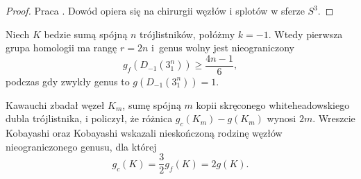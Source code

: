 \begin{proof}
    Praca \cite{moriah87}.
    Dowód opiera się na chirurgii węzłów i splotów w sferze $S^3$.
\end{proof}

\begin{corollary}
    Niech $K$ bedzie sumą spójną $n$ trójlistników, połóżmy $k = -1$.
    Wtedy pierwsza grupa homologii ma rangę $r = 2n$ i~genus wolny jest nieograniczony
    \begin{equation}
        g_f(D_{-1}(3_1^n)) \ge \frac {4n-1} {6},
    \end{equation}
    podczas gdy zwykły genus to $g(D_{-1}(3_1^n)) = 1$.
\end{corollary}

Kawauchi \cite{kawauchi94} zbadał węzeł $K_m$, sumę spójną $m$ kopii skręconego whiteheadowskiego dubla trójlistnika, i policzył, że różnica $g_c(K_m) - g(K_m)$ wynosi $2m$.
%
Wreszcie Kobayashi oraz Kobayashi \cite{kobayashi96} wskazali nieskończoną rodzinę węzłów nieograniczonego genusu, dla której
%
%
\begin{equation}
    g_c(K) = \frac 32 g_f(K) = 2g(K).
\end{equation}

